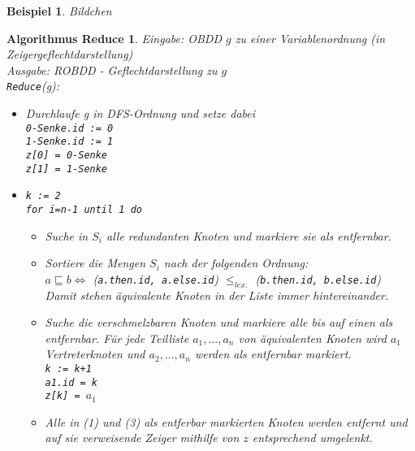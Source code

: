 \documentclass[ngerman]{scrartcl}
\theoremstyle{custom}
\newtheorem{mex}[mdef]{Beispiel}
\newtheorem{algred}[mdef]{Algorithmus Reduce}
\newcommand{\0}{\mathbf{0}}
\newcommand{\1}{\mathbf{L}}
\begin{document}
\begin{mex}
Bildchen
\end{mex}

\begin{algred}
  Eingabe: OBDD $g$ zu einer Variablenordnung (in
  Zeigergeflechtdarstellung)\\
  Ausgabe: ROBDD - Geflechtdarstellung zu $g$ \\

  \texttt{Reduce}(g):
  \begin{itemize}
  \item[(1)] Durchlaufe g in DFS-Ordnung und setze dabei\\
      \lstinline{0-Senke.id := 0}\\
      \lstinline{1-Senke.id := 1}\\
      \lstinline{z[0] = 0-Senke}\\
      \lstinline{z[1] = 1-Senke}
 \item[(2)] \lstinline{k := 2}\\
      \lstinline{for i=n-1 until 1 do}
      \begin{itemize}  
      \item[(1)] Suche in $S_i$ alle redundanten Knoten und markiere sie als
entfernbar.
      \item[(2)] Sortiere die Mengen $S_i$ nach der folgenden Ordnung:\\
      $a \sqsubseteq b \Leftrightarrow$ (\lstinline{a.then.id, a.else.id})
           $\leq_{lex.}$ (\lstinline{b.then.id, b.else.id})\\
      Damit stehen \"aquivalente Knoten in der Liste immer
      hintereinander.
      \item[(3)] Suche die verschmelzbaren Knoten und markiere alle
        bis auf einen als entfernbar. F\"ur jede Teilliste
        $a_1,\dots,a_n$ von \"aquivalenten Knoten wird $a_1$
        Vertreterknoten und $a_2,\dots,a_n$ werden als entfernbar
        markiert.\\
        \lstinline{k := k+1}\\
        \lstinline{a1.id = k}\\
        \lstinline{z[k] = }$a_1$
        \item[(4)] Alle in (1) und (3) als entferbar markierten Knoten
          werden entfernt und auf sie verweisende Zeiger mithilfe von
          $z$ entsprechend umgelenkt.
    \end{itemize}
  \end{itemize}  
\end{algred}
\end{document}
